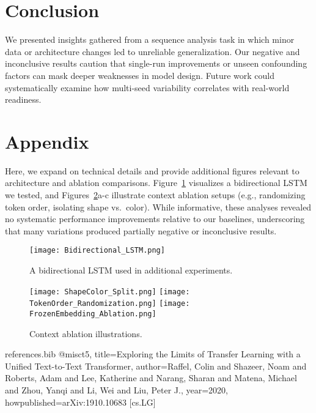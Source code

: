 \documentclass[11pt,onecolumn]{article}
\begin{document}
\section{Conclusion}
We presented insights gathered from a sequence analysis task in which minor data or architecture changes led to unreliable generalization. Our negative and inconclusive results caution that single-run improvements or unseen confounding factors can mask deeper weaknesses in model design. Future work could systematically examine how multi-seed variability correlates with real-world readiness.




\appendix
\section{Appendix}
Here, we expand on technical details and provide additional figures relevant to architecture and ablation comparisons. Figure~\ref{fig:lstm} visualizes a bidirectional LSTM we tested, and Figures~\ref{fig:context_abl}a-c illustrate context ablation setups (e.g., randomizing token order, isolating shape vs.\ color). While informative, these analyses revealed no systematic performance improvements relative to our baselines, underscoring that many variations produced partially negative or inconclusive results.

\begin{figure}[h]
    \centering
    \texttt{[image: Bidirectional\_LSTM.png]}
    \caption{A bidirectional LSTM used in additional experiments.\label{fig:lstm}}
\end{figure}

\begin{figure}[h]
    \centering
      \texttt{[image: ShapeColor\_Split.png]}
    \endminipage
      \texttt{[image: TokenOrder\_Randomization.png]}
    \endminipage
      \texttt{[image: FrozenEmbedding\_Ablation.png]}
    \endminipage
    \caption{Context ablation illustrations.\label{fig:context_abl}}
\end{figure}

\clearpage

\begin{filecontents}{references.bib}
@misc{t5,
  title={Exploring the Limits of Transfer Learning with a Unified Text-to-Text Transformer},
  author={Raffel, Colin and Shazeer, Noam and Roberts, Adam and Lee, Katherine and Narang, Sharan and Matena, Michael and Zhou, Yanqi and Li, Wei and Liu, Peter J.},
  year=2020,
  howpublished={arXiv:1910.10683 [cs.LG]}
}
\end{filecontents}
\end{document}
